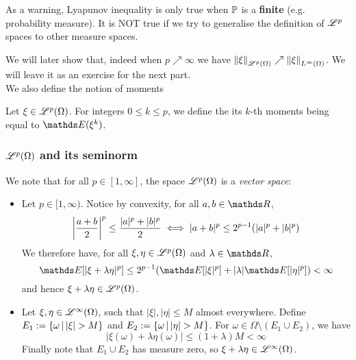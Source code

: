 \begin{remark}
As a warning, Lyapunov inequality is only true when $\mathbb{P}$ is a \textbf{finite} (e.g. probability measure). It is NOT true if we try to generalise the definition of $\mathcal{L}^p$ spaces to other measure spaces.
\end{remark}

We will later show that, indeed when $p \nearrow \infty$ we have $\left\| \xi \right\|_{\mathcal{L}^p(\Omega)} \nearrow \left\| \xi \right\|_{L^\infty(\Omega)}$. We will leave it as an exercise for the next part. \\

We also define the notion of moments
\begin{definition}[Moments]
Let $\xi \in \mathcal{L}^p(\Omega)$. For integers $0 \leq k \leq p$, we define the its $k$-th moments being equal to $\E(\xi^k)$.
\end{definition}

\subsubsection{$\mathcal{L}^p(\Omega)$ and its seminorm}
We note that for all $p \in [1,\infty]$, the space $\mathcal{L}^p(\Omega)$ is a \textit{vector space}:
\begin{itemize}
    \item Let $p \in [1,\infty)$. Notice by convexity, for all $a,b \in \R$,
    \begin{equation*}
        \left| \frac{a+b}{2} \right|^p \leq \frac{|a|^p + |b|^p}{2} \iff |a+b|^p \leq 2^{p-1} (|a|^p + |b|^p)
    \end{equation*}
    We therefore have, for all $\xi, \eta \in \mathcal{L}^p(\Omega)$ and $\lambda \in \R$,
    \begin{equation*}
        \E[|\xi + \lambda \eta|^p] \leq 2^{p-1}(\E[|\xi|^p] + |\lambda| \E[|\eta|^p]) < \infty
    \end{equation*}
    and hence $\xi + \lambda \eta \in \mathcal{L}^p(\Omega)$.
    \item Let $\xi, \eta \in \mathcal{L}^\infty(\Omega)$, such that $|\xi|, |\eta| \leq M$ almost everywhere. Define $E_1 := \left\{ \omega \,|\, |\xi| > M \right \}$ and $E_2 := \left\{ \omega \,|\, |\eta| > M \right \}$. For $\omega \in \Omega \setminus (E_1 \cup E_2)$, we have
    \begin{equation} \label{eq:Minkowski_infty}
        |\xi(\omega) + \lambda \eta(\omega)| \leq (1+\lambda) M < \infty
    \end{equation}
    Finally note that $E_1 \cup E_2$ has measure zero, so $\xi + \lambda \eta \in \mathcal{L}^\infty(\Omega)$.
\end{itemize}

